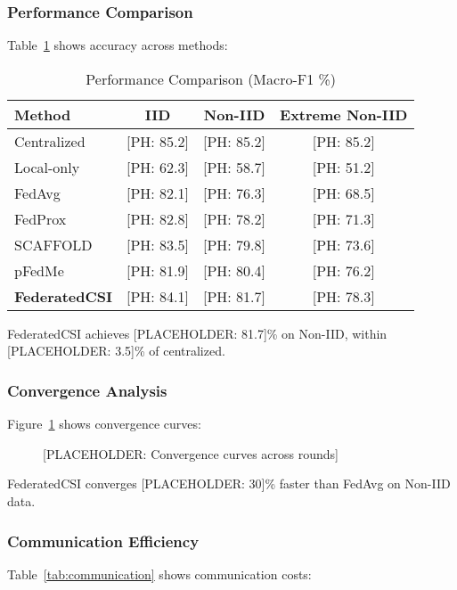 \documentclass[journal]{IEEEtran}
\begin{document}
\subsubsection{Performance Comparison}
Table~\ref{tab:performance} shows accuracy across methods:

\begin{table}[h]
\centering
\caption{Performance Comparison (Macro-F1 \%)}
\label{tab:performance}
\begin{tabular}{lccc}
\toprule
Method & IID & Non-IID & Extreme Non-IID \\
\midrule
Centralized & [PH: 85.2] & [PH: 85.2] & [PH: 85.2] \\
Local-only & [PH: 62.3] & [PH: 58.7] & [PH: 51.2] \\
FedAvg & [PH: 82.1] & [PH: 76.3] & [PH: 68.5] \\
FedProx & [PH: 82.8] & [PH: 78.2] & [PH: 71.3] \\
SCAFFOLD & [PH: 83.5] & [PH: 79.8] & [PH: 73.6] \\
pFedMe & [PH: 81.9] & [PH: 80.4] & [PH: 76.2] \\
\textbf{FederatedCSI} & [PH: 84.1] & [PH: 81.7] & [PH: 78.3] \\
\bottomrule
\end{tabular}
\end{table}

FederatedCSI achieves [PLACEHOLDER: 81.7]\% on Non-IID, within [PLACEHOLDER: 3.5]\% of centralized.

\subsubsection{Convergence Analysis}
Figure~\ref{fig:convergence} shows convergence curves:

\begin{figure}[h]
\centering
\caption{[PLACEHOLDER: Convergence curves across rounds]}
\label{fig:convergence}
\end{figure}

FederatedCSI converges [PLACEHOLDER: 30]\% faster than FedAvg on Non-IID data.

\subsubsection{Communication Efficiency}
Table~\ref{tab:communication} shows communication costs:
\end{document}

